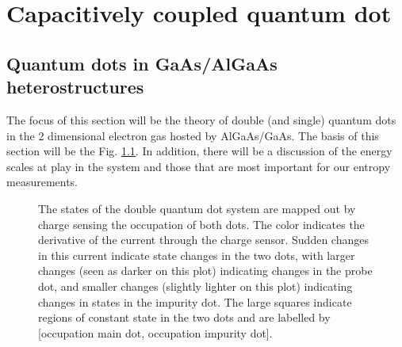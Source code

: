 
\chapter{Capacitively coupled quantum dot}
\label{ch:Methods}
\section{Quantum dots in GaAs/AlGaAs heterostructures}
\label{sec:qds}

The focus of this section will be the theory of double (and single) quantum dots in the 2 dimensional electron gas hosted by AlGaAs/GaAs. The basis of this section will be the Fig. \ref{fig:dqd}. In addition, there will be a discussion of the energy scales at play in the system and those that are most important for our entropy measurements.

\begin{figure}[h]
\centering
{}
\caption{The states of the double quantum dot system are mapped out by charge sensing the occupation of both dots. The color indicates the derivative of the current through the charge sensor. Sudden changes in this current indicate state changes in the two dots, with larger changes (seen as darker on this plot) indicating changes in the probe dot, and smaller changes (slightly lighter on this plot) indicating changes in states in the impurity dot. The large squares indicate regions of constant state in the two dots and are labelled by [occupation main dot, occupation impurity dot].}
\label{fig:dqd}       %
\end{figure}

